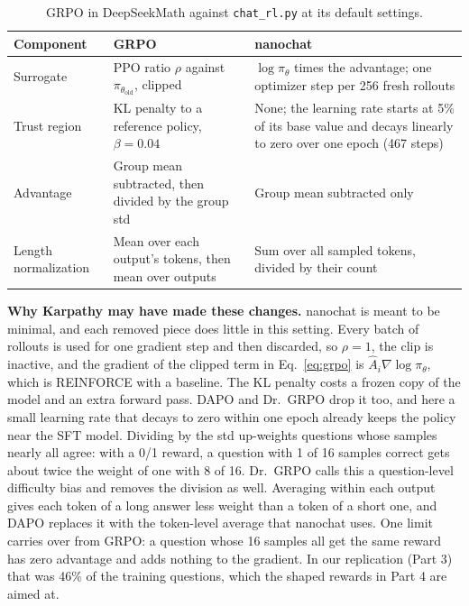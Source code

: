 \documentclass[11pt]{article}
\newcommand{\code}[1]{\texttt{#1}}
\begin{document}
\begin{table}[H]
\centering
\small
\renewcommand{\arraystretch}{1.15}
\caption{GRPO in DeepSeekMath \cite{grpo} against \code{chat\_rl.py} at its default settings.}\label{tab:grpo}
\begin{tabular}{L{2.7cm} L{5.6cm} L{6.5cm}}
\toprule
\textbf{Component} & \textbf{GRPO} & \textbf{nanochat} \\
\midrule
Surrogate & PPO ratio $\rho$ against $\pi_{\theta_{\text{old}}}$, clipped & $\log\pi_\theta$ times the advantage; one optimizer step per 256 fresh rollouts \\
Trust region & KL penalty to a reference policy, $\beta = 0.04$ & None; the learning rate starts at 5\% of its base value and decays linearly to zero over one epoch (467 steps) \\
Advantage & Group mean subtracted, then divided by the group std & Group mean subtracted only \\
Length normalization & Mean over each output's tokens, then mean over outputs & Sum over all sampled tokens, divided by their count \\
\bottomrule
\end{tabular}
\end{table}

\textbf{Why Karpathy may have made these changes.} nanochat is meant to be minimal, and each removed piece does little in this setting. Every batch of rollouts is used for one gradient step and then discarded, so $\rho = 1$, the clip is inactive, and the gradient of the clipped term in Eq.~\ref{eq:grpo} is $\hat{A}_i\nabla\log\pi_\theta$, which is REINFORCE with a baseline. The KL penalty costs a frozen copy of the model and an extra forward pass. DAPO \cite{dapo} and Dr.~GRPO \cite{drgrpo} drop it too, and here a small learning rate that decays to zero within one epoch already keeps the policy near the SFT model. Dividing by the std up-weights questions whose samples nearly all agree: with a 0/1 reward, a question with 1 of 16 samples correct gets about twice the weight of one with 8 of 16. Dr.~GRPO calls this a question-level difficulty bias and removes the division as well. Averaging within each output gives each token of a long answer less weight than a token of a short one, and DAPO replaces it with the token-level average that nanochat uses. One limit carries over from GRPO: a question whose 16 samples all get the same reward has zero advantage and adds nothing to the gradient. In our replication (Part 3) that was 46\% of the training questions, which the shaped rewards in Part 4 are aimed at.
\end{document}
